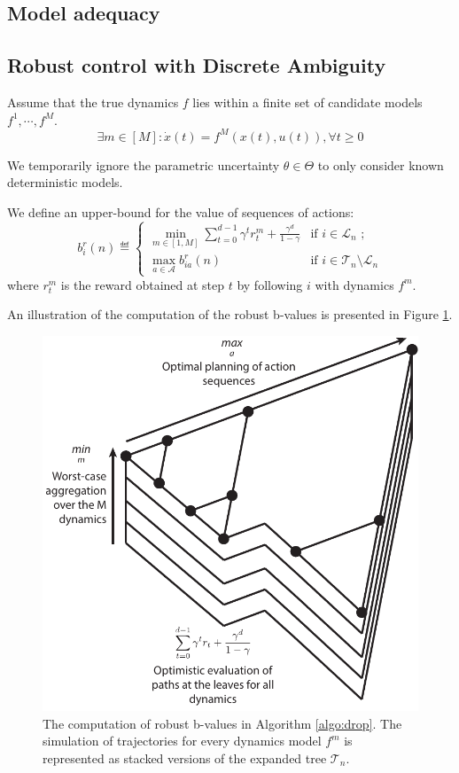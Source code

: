 \documentclass{article}
\begin{document}
\subsection{Model adequacy}
\subsection{Robust control with Discrete Ambiguity}


\begin{assumption}
Assume that the true dynamics $f$ lies within a finite set of candidate models $f^1, \cdots, f^M$.
\begin{equation}
\exists m\in[M]: \dot{x}(t) = f^M(x(t), u(t)), \forall t\geq 0
\end{equation}

We temporarily ignore the parametric uncertainty $\theta\in\Theta$ to only consider known deterministic models.
\end{assumption}

\begin{definition} We define an upper-bound for the value of sequences of actions:
\begin{equation}
\label{eq:robust_sequence_ucb}
b_i^r(n)  \eqdef
\begin{cases}
\min_{m\in[1, M]} \sum_{t=0}^{d-1} \gamma^t r_t^m  + \frac{\gamma^d}{1-\gamma} &\text{if } i \in \mathcal{L}_n \text{ ;}\\
\max_{a\in\mathcal{A}} b_{ia}^r(n) & \text{if } i \in \mathcal{T}_n \setminus \mathcal{L}_n 
\end{cases}
\end{equation}
where $r_t^m$ is the reward obtained at step $t$ by following $i$ with dynamics $f^m$.
\end{definition}
An illustration of the computation of the robust b-values is presented in Figure \ref{fig:drop}.


\begin{figure}
\centering
\includegraphics[width=0.5\linewidth]{img/robust-control-tree}
\caption{The computation of robust b-values in Algorithm \ref{algo:drop}. The simulation of trajectories for every dynamics model $f^m$ is represented as stacked versions of the expanded tree $\mathcal{T}_n$.}
\label{fig:drop}
\end{figure}
\end{document}
